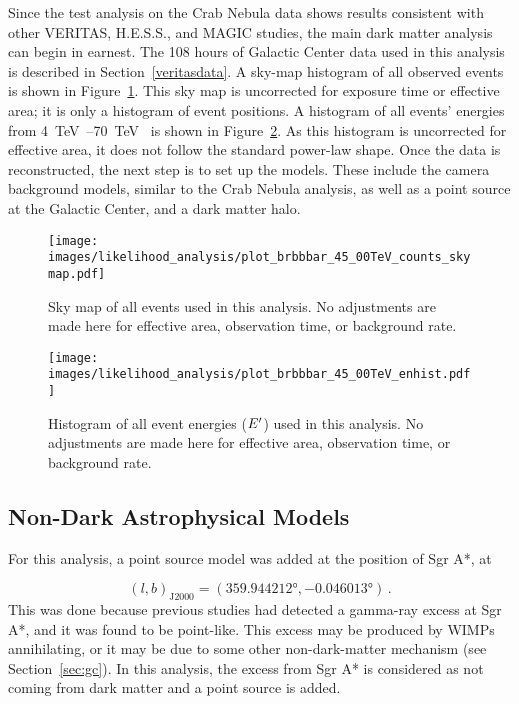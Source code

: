 Since the test analysis on the Crab Nebula data shows results consistent with other VERITAS, H.E.S.S., and MAGIC studies, the main dark matter analysis can begin in earnest.
The 108 hours of Galactic Center data used in this analysis is described in Section~\ref{veritasdata}.
A sky-map histogram of all observed events is shown in Figure~\ref{fig:gc_counts_skymap}.
This sky map is uncorrected for exposure time or effective area; it is only a histogram of event positions.
A histogram of all events' energies from \SIrange{4}{70}{\TeV{}} is shown in Figure~\ref{fig:gc_counts_enhist}.
As this histogram is uncorrected for effective area, it does not follow the standard power-law shape.
Once the data is reconstructed, the next step is to set up the models.
These include the camera background models, similar to the Crab Nebula analysis, as well as a point source at the Galactic Center, and a dark matter halo.
  
\begin{figure}[bt]
  \centering
  \texttt{[image: images/likelihood\_analysis/plot\_brbbbar\_45\_00TeV\_counts\_skymap.pdf]}
  \caption[Galactic Center Counts Sky Map]{
    Sky map of all events used in this analysis.
    No adjustments are made here for effective area, observation time, or background rate.
  }
  \label{fig:gc_counts_skymap}
\end{figure}

\begin{figure}[tb]
  \centering
  \texttt{[image: images/likelihood\_analysis/plot\_brbbbar\_45\_00TeV\_enhist.pdf]}
  \caption[Galactic Center Counts Energy Histogram]{
    Histogram of all event energies ($E'$) used in this analysis.
    No adjustments are made here for effective area, observation time, or background rate.
  }
  \label{fig:gc_counts_enhist}
\end{figure}

\FloatBarrier

\subsection{Non-Dark Astrophysical Models}\label{subsec:gcpointsrc}
For this analysis, a point source model was added at the position of Sgr A*, at

$$(l,b)_{\textrm{J2000}} = (\ang{359.944212}, \ang{-0.046013}) \,. $$
This was done because previous studies had detected a gamma-ray excess at Sgr A*, and it was found to be point-like.
This excess may be produced by WIMPs annihilating, or it may be due to some other non-dark-matter mechanism (see Section~\ref{sec:gc}).
In this analysis, the excess from Sgr A* is considered as not coming from dark matter and a point source is added.

